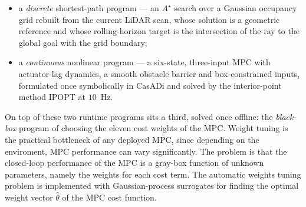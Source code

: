\documentclass[11pt,a4paper]{article}
\newcommand{\astar}{$A^\star$}
\begin{document}
\begin{itemize}
  \item a \emph{discrete} shortest-path program --- an \astar{} search over a Gaussian occupancy grid rebuilt
        from the current LiDAR scan, whose solution is a geometric reference and whose rolling-horizon target
        is the intersection of the ray to the global goal with the grid boundary;
  \item a \emph{continuous} nonlinear program --- a six-state, three-input MPC with actuator-lag dynamics, a
        smooth obstacle barrier and box-constrained inputs, formulated once symbolically in CasADi
        \cite{andersson2019casadi} and solved by the interior-point method IPOPT
        \cite{wachter2006ipopt} at $10$~Hz.
\end{itemize}

On top of these two runtime programs sits a third, solved once offline: the \emph{black-box} program of
choosing the eleven cost weights of the MPC. Weight tuning is the practical bottleneck of any deployed MPC, since depending on the enviroment, MPC performance can vary significantly. The problem is that the closed-loop performance of the MPC is a gray-box function of unknown parameters, namely the weights for each cost term. The automatic weights tuning problem is
implemented with Gaussian-process surrogates \cite{rasmussen2006gp,shahriari2016bo} for finding the optimal weight vector $\hat\theta$ of the MPC cost function. 
\end{document}
